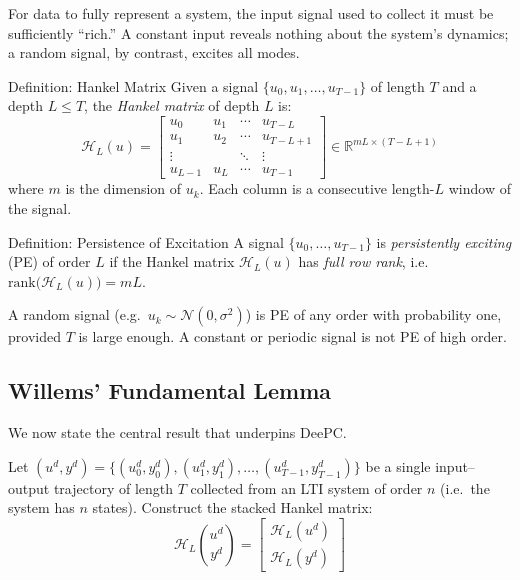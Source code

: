 For data to fully represent a system, the input signal used to collect it must be sufficiently ``rich.'' A constant input reveals nothing about the system's dynamics; a random signal, by contrast, excites all modes.

\begin{defnbox}{Definition: Hankel Matrix}
	Given a signal $\{u_0, u_1, \ldots, u_{T-1}\}$ of length $T$ and a depth $L \le T$, the \emph{Hankel matrix} of depth $L$ is:
	\[
	\mathcal{H}_L(u) = \begin{bmatrix}
		u_0     & u_1     & \cdots & u_{T-L} \\
		u_1     & u_2     & \cdots & u_{T-L+1} \\
		\vdots  &         & \ddots & \vdots \\
		u_{L-1} & u_L     & \cdots & u_{T-1}
	\end{bmatrix} \in \mathbb{R}^{mL \times (T-L+1)}
	\]
	where $m$ is the dimension of $u_k$. Each column is a consecutive length-$L$ window of the signal.
\end{defnbox}

\begin{defnbox}{Definition: Persistence of Excitation}
	A signal $\{u_0, \ldots, u_{T-1}\}$ is \emph{persistently exciting} (PE) of order $L$ if the Hankel matrix $\mathcal{H}_L(u)$ has \emph{full row rank}, i.e.\ $\text{rank}\bigl(\mathcal{H}_L(u)\bigr) = mL$.

	A random signal (e.g.\ $u_k \sim \mathcal{N}(0, \sigma^2)$) is PE of any order with probability one, provided $T$ is large enough. A constant or periodic signal is not PE of high order.
\end{defnbox}

\subsection{Willems' Fundamental Lemma}
\label{sec:willems}

We now state the central result that underpins DeePC.

Let $(u^d, y^d) = \{(u_0^d, y_0^d), (u_1^d, y_1^d), \ldots, (u_{T-1}^d, y_{T-1}^d)\}$ be a single input--output trajectory of length $T$ collected from an LTI system of order $n$ (i.e.\ the system has $n$ states). Construct the stacked Hankel matrix:
\[
\mathcal{H}_L\!\binom{u^d}{y^d} = \begin{bmatrix} \mathcal{H}_L(u^d) \\ \mathcal{H}_L(y^d) \end{bmatrix}
\]

